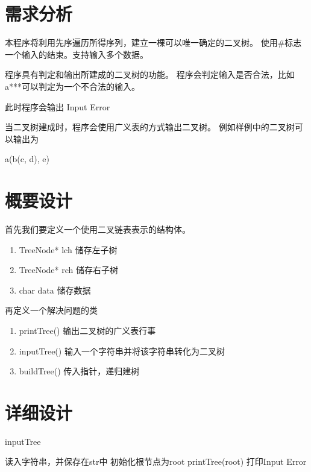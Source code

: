 \section{需求分析}
   本程序将利用先序遍历所得序列，建立一棵可以唯一确定的二叉树。
   使用\#标志一个输入的结束。支持输入多个数据。


   程序具有判定和输出所建成的二叉树的功能。
   程序会判定输入是否合法，比如a***可以判定为一个不合法的输入。


   此时程序会输出 Input Error


   当二叉树建成时，程序会使用广义表的方式输出二叉树。
   例如样例中的二叉树可以输出为


   a(b(c, d), e)
   
\section{概要设计}
   首先我们要定义一个使用二叉链表表示的结构体。
   \begin{enumerate}
      \item TreeNode* lch  储存左子树
      \item TreeNode* rch  储存右子树
      \item char  data  储存数据
   \end{enumerate}


   再定义一个解决问题的类
   \begin{enumerate}
      \item printTree() 输出二叉树的广义表行事
      \item inputTree() 输入一个字符串并将该字符串转化为二叉树
      \item buildTree() 传入指针，递归建树
   \end{enumerate}

\newpage

\section{详细设计}

\begin{algorithm}[htb] 
   \caption{ inputTree } 
   \label{alg:Framwork} 
   \begin{algorithmic}[1]
         \State 读入字符串，并保存在str中
         \State 初始化根节点为root
            \State printTree(root)
         \Else
            \State 打印Input Error
         \EndIf
      \EndFunction
   \end{algorithmic} 
\end{algorithm}


